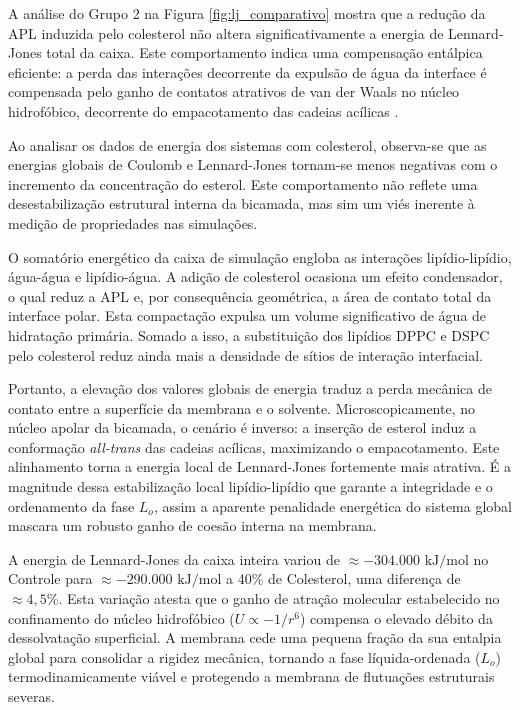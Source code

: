 A análise do Grupo 2 na Figura \ref{fig:lj_comparativo} mostra que a redução da APL induzida pelo colesterol não altera significativamente a energia de Lennard-Jones total da caixa. Este comportamento indica uma compensação entálpica eficiente: a perda das interações decorrente da expulsão de água da interface é compensada pelo ganho de contatos atrativos de van der Waals no núcleo hidrofóbico, decorrente do empacotamento das cadeias acílicas \cite{peccati2021enthalpy}.

Ao analisar os dados de energia dos sistemas com colesterol, observa-se que as energias globais de Coulomb e Lennard-Jones tornam-se menos negativas com o incremento da concentração do esterol. Este comportamento não reflete uma desestabilização estrutural interna da bicamada, mas sim um viés inerente à medição de propriedades nas simulações.

O somatório energético da caixa de simulação engloba as interações lipídio-lipídio, água-água e lipídio-água. A adição de colesterol ocasiona um efeito condensador, o qual reduz a APL e, por consequência geométrica, a área de contato total da interface polar. Esta compactação expulsa um volume significativo de água de hidratação primária. Somado a isso, a substituição dos lipídios DPPC e DSPC pelo colesterol reduz ainda mais a densidade de sítios de interação interfacial.

Portanto, a elevação dos valores globais de energia traduz a perda mecânica de contato entre a superfície da membrana e o solvente. Microscopicamente, no núcleo apolar da bicamada, o cenário é inverso: a inserção de esterol induz a conformação \textit{all-trans} das cadeias acílicas, maximizando o empacotamento. Este alinhamento torna a energia local de Lennard-Jones fortemente mais atrativa. É a magnitude dessa estabilização local lipídio-lipídio que garante a integridade e o ordenamento da fase $L_o$, assim a aparente penalidade energética do sistema global mascara um robusto ganho de coesão interna na membrana.

A energia de Lennard-Jones da caixa inteira variou de $\approx -304.000\text{ kJ/mol}$ no Controle para $\approx -290.000\text{ kJ/mol}$ a 40\% de Colesterol, uma diferença de $\approx 4,5\%$. Esta variação atesta que o ganho de atração molecular estabelecido no confinamento do núcleo hidrofóbico ($U \propto -1/r^6$) compensa o elevado débito da dessolvatação superficial. A membrana cede uma pequena fração da sua entalpia global para consolidar a rigidez mecânica, tornando a fase líquida-ordenada ($L_o$) termodinamicamente viável e protegendo a membrana de flutuações estruturais severas.

